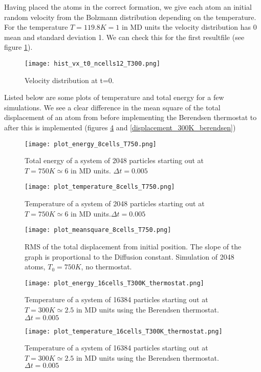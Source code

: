 \documentclass[a4paper,english, 10pt, twoside]{article}
\begin{document}
Having placed the atoms in the correct formation, we give each atom an initial random velocity 
from the Bolzmann distribution depending on the temperature. \\
For the temperature $T = 119.8K = 1$ in MD units the velocity distribution has 0 mean and 
standard deviation 1. We can check this for the first resultfile (see figure \ref{distribution_vx_t0}).
\begin{figure}[H]
\centering
\texttt{[image: hist\_vx\_t0\_ncells12\_T300.png]}
\caption{Velocity distribution at t=0.}
\label{distribution_vx_t0}
\end{figure}
Listed below are some plots of temperature and total energy for a few simulations. We see a clear 
difference in the mean square of the total displacement of an atom from before implementing the 
Berendsen thermostat to after this is implemented (figures \ref{displacement_750K} and 
\ref{displacement_300K_berendsen})

\begin{figure}[H]
\centering
\texttt{[image: plot\_energy\_8cells\_T750.png]}
\caption{Total energy of a system of 2048 particles starting out at $T=750K \simeq 6$ in MD 
units. $\Delta t = 0.005$}
\label{energy_750K}
\end{figure}

\begin{figure}[H]
\centering
\texttt{[image: plot\_temperature\_8cells\_T750.png]}
\caption{Temperature of a system of 2048 particles starting out at $T=750K \simeq 6$ in MD 
units.$\Delta t = 0.005$}
\label{temperature_750K}
\end{figure}

\begin{figure}[H]
\centering
\texttt{[image: plot\_meansquare\_8cells\_T750.png]}
\caption{RMS of the total displacement from initial position. The slope of the graph 
is proportional to the Diffusion constant. Simulation of 2048 atoms, $T_0=750K$, no thermostat.}
\label{displacement_750K}
\end{figure}

\begin{figure}[H]
\centering
\texttt{[image: plot\_energy\_16cells\_T300K\_thermostat.png]}
\caption{Temperature of a system of 16384 particles starting out at $T=300K \simeq 2.5$ in 
MD units using the Berendsen thermostat. $\Delta t = 0.005$}
\label{energy_300K_berendsen}
\end{figure}

\begin{figure}[H]
\centering
\texttt{[image: plot\_temperature\_16cells\_T300K\_thermostat.png]}
\caption{Temperature of a system of 16384 particles starting out at $T=300K \simeq 2.5$ in MD units 
using the Berendsen thermostat. $\Delta t = 0.005$}
\label{temperature_300K_berendsen}
\end{figure}
\end{document}
